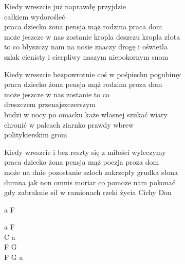 \begin{text}

    Kiedy wreszcie już naprawdę przyjdzie\\
    \vin\vin\vin\vin\vin\vin całkiem wydorośleć\\
    praca dziecko żona pensja mąż rodzina praca dom\\
    może jeszcze w nas zostanie kropla deszczu kropla złota\\
    to co błyszczy nam na nosie znaczy drogę i oświetla\\
    szlak cienisty i cierpliwy naszym niepokornym snom

    Kiedy wreszcie bezpowrotnie coś w pośpiechu pogubimy\\
    praca dziecko żona pensja mąż rodzina proza dom\\
    może jeszcze w nas zostanie to co\\
    \vin\vin\vin\vin\vin\vin dreszczem przenajszczerszym\\
    budzi w nocy po omacku każe własnej szukać wiary\\
    chronić w palcach ziarnko prawdy wbrew\\
    \vin\vin\vin\vin\vin\vin politykierskim grom

    Kiedy wreszcie i bez reszty się z miłości wyleczymy\\
    praca dziecko żona pensja mąż poezja proza dom\\
    może na dnie pozostanie szloch zakrzepły grudka słona\\
    dumna jak non omnis moriar co pomoże nam pokonać\\
    gdy zabraknie sił w ramionach rzeki życia Cichy Don
    
\end{text}
\begin{chord}
    \small{
    a F

    a F\\
    C a\\
    F G\\
    F G a
    }
\end{chord}